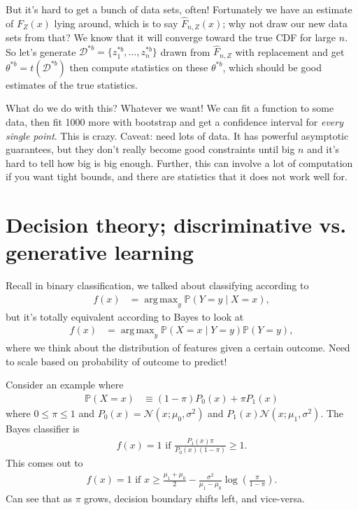\documentclass[11pt,letterpaper]{article}
\DeclareMathOperator*{\argmax}{arg\,max}
\theoremstyle{definition}
\numberwithin{equation}{section}
\numberwithin{figure}{section}
\begin{document}
But it's hard to get a bunch of data sets, often! Fortunately we have an estimate of $F_Z(x)$ lying around, which is to say $\hat{F}_{n,Z}(x)$; why not draw our new data sets from that? We know that it will converge toward the true CDF for large $n$. So let's generate $\mathcal{D}^{\ast b} = \{z_1^{\ast b}, \ldots, z_n^{\ast b}\}$ drawn from $\hat{F}_{n,Z}$ with replacement and get $\theta^{\ast b} = t(\mathcal{D}^{\ast b})$ then compute statistics on these $\theta^{\ast b}$, which should be good estimates of the true statistics.


What do we do with this? Whatever we want! We can fit a function to some data, then fit 1000 more with bootstrap and get a confidence interval for \emph{every single point}. This is crazy. Caveat: need lots of data. It has powerful asymptotic guarantees, but they don't really become good constraints until big $n$ and it's hard to tell how big is big enough. Further, this can involve a lot of computation if you want tight bounds, and there are statistics that it does not work well for.











\section{Decision theory; discriminative vs. generative learning}
Recall in binary classification, we talked about classifying according to
%
\begin{align}
	f(x) &= \argmax_y \mathbb{P}(Y=y \mid X=x),
\end{align}
%
but it's totally equivalent according to Bayes to look at
%
\begin{align}
	f(x) &= \argmax_y \mathbb{P}(X=x \mid Y=y) \mathbb{P}(Y=y),
\end{align}
%
where we think about the distribution of features given a certain outcome. Need to scale based on probability of outcome to predict!


Consider an example where
%
\begin{align}
	\mathbb{P}(X=x) &\equiv (1-\pi) P_0(x) + \pi P_1(x)
\end{align}
%
where $0\leq\pi \leq 1$ and $P_0(x) = \mathcal{N}(x; \mu_0, \sigma^2)$ and $P_1(x) \mathcal{N}(x;\mu_1,\sigma^2)$. The Bayes classifier is
%
\begin{align}
	f(x) = 1 \text{ if } \frac{P_1(x) \pi}{P_0(x) (1-\pi)} \geq 1.
\end{align}
%
This comes out to
%
\begin{align}
	f(x) = 1 \text{ if } x \geq \frac{\mu_1 +\mu_0}{2} - \frac{\sigma^2}{\mu_1 - \mu_0} \log\left(\frac{\pi}{1-\pi}\right).
\end{align}
%
Can see that as $\pi$ grows, decision boundary shifts left, and vice-versa.
\end{document}
